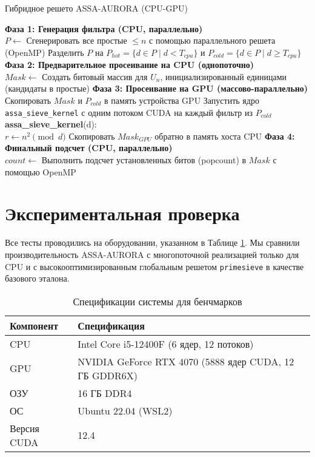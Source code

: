 \documentclass[11pt]{article}
\begin{document}
\begin{algorithm}[H]
\caption{Гибридное решето ASSA-AURORA (CPU-GPU)}
\label{alg:assa_aurora}
\BlankLine
\textbf{Фаза 1: Генерация фильтра (CPU, параллельно)}\\
$P \leftarrow$ Сгенерировать все простые $\leq n$ с помощью параллельного решета (OpenMP)\;
Разделить $P$ на $P_{hot} = \{d \in P \mid d < T_{cpu}\}$ и $P_{cold} = \{d \in P \mid d \geq T_{cpu}\}$\;
\BlankLine
\textbf{Фаза 2: Предварительное просеивание на CPU (однопоточно)}\\
$Mask \leftarrow$ Создать битовый массив для $U_n$, инициализированный единицами (кандидаты в простые)\;
\BlankLine
\textbf{Фаза 3: Просеивание на GPU (массово-параллельно)}\\
Скопировать $Mask$ и $P_{cold}$ в память устройства GPU\;
Запустить ядро \texttt{assa\_sieve\_kernel} с одним потоком CUDA на каждый фильтр из $P_{cold}$\;
\Indp
\textbf{assa\_sieve\_kernel}(d):\\
    $r \leftarrow n^2 \pmod{d}$\;
\Indm
Скопировать $Mask_{GPU}$ обратно в память хоста CPU\;
\BlankLine
\textbf{Фаза 4: Финальный подсчет (CPU, параллельно)}\\
$count \leftarrow$ Выполнить подсчет установленных битов (popcount) в $Mask$ с помощью OpenMP\;
\;
\end{algorithm}

\section{Экспериментальная проверка}

Все тесты проводились на оборудовании, указанном в Таблице \ref{tab:specs}. Мы сравнили производительность ASSA-AURORA с многопоточной реализацией только для CPU и с высокооптимизированным глобальным решетом \texttt{primesieve} в качестве базового эталона.

\begin{table}[h!]
\centering \caption{Спецификации системы для бенчмарков} \label{tab:specs}
\begin{tabular}{ll}
\toprule \textbf{Компонент} & \textbf{Спецификация} \\ \midrule
CPU & Intel Core i5-12400F (6 ядер, 12 потоков) \\
GPU & NVIDIA GeForce RTX 4070 (5888 ядер CUDA, 12 ГБ GDDR6X) \\
ОЗУ & 16 ГБ DDR4 \\
ОС & Ubuntu 22.04 (WSL2) \\
Версия CUDA & 12.4 \\
\bottomrule
\end{tabular}
\end{table}
\end{document}
